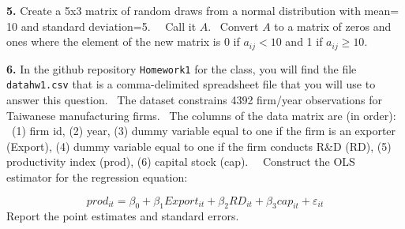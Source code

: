 \documentclass[10pt]{article}
\begin{document}
\bigskip 

\noindent
\textbf{5.} Create a 5x3 matrix of random draws from a normal distribution with
mean= 10 and standard deviation=5. \ \ Call it $A$. \ Convert $A$ to a
matrix of zeros and ones where the element of the new matrix is 0 if $%
a_{ij}<10$ and 1 if $a_{ij}\geq 10.$ 

\bigskip 

\noindent
\textbf{6.}  In the github repository {\tt Homework1} for the class, you will find the file {\tt datahw1.csv} that is a
comma-delimited spreadsheet file that you will use to answer this question.
\ The dataset constrains 4392 firm/year observations for Taiwanese
manufacturing firms. \ The columns of the data matrix are (in order): \ (1)
firm id, (2) year, (3) dummy variable equal to one if the firm is an
exporter (Export), (4) dummy variable equal to one if the firm conducts R\&D
(RD), (5) productivity index (prod), (6) capital stock (cap). \ \ Construct
the OLS estimator for the
regression equation: \ 

$$prod_{it}=\beta _{0}+\beta _{1}Export_{it}+\beta _{2}RD_{it}+\beta
_{3}cap_{it} + \varepsilon _{it}$$
Report the point estimates and standard errors.
\end{document}
